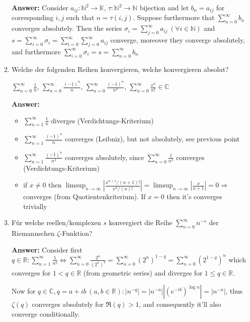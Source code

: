 \documentclass[11pt]{article}
\newcommand{\abs}[1]{\left|#1\right|}
\newcommand{\sumn}[4]{\sum_{#1=#2}^{#3}{#4}}
\newcommand{\RR}[0]{\mathbb{R}}
\newcommand{\CC}[0]{\mathbb{C}}
\newcommand{\NN}[0]{\mathbb{N}}
\newcommand{\KK}[0]{\mathbb{K}}
\begin{document}
\begin{enumerate}
    \textbf{Answer:} Consider $a_{ij}:\NN^2 \to \KK$, $\tau:\NN^2 \to \NN$ bijection and let $b_n = a_{ij}$ for corresponding $i, j$ such that $n = \tau(i, j)$. Suppose furthermore that $\sumn{n}{0}{\infty}{b_n}$ converges absolutely. Then the series $\sigma_i = \sumn{j}{0}{\infty}{a_{ij}}~(\forall i\in\NN)$ and $s = \sumn{i}{0}{\infty}{\sigma_i} = \sumn{i}{0}{\infty}{\sumn{j}{0}{\infty}{a_{ij}}}$ converge, moreover they converge absolutely, and furthermore $\sumn{i}{0}{\infty}{\sigma_i} = s = \sumn{n}{0}{\infty}{b_n}$

    \item  Welche der folgenden Reihen konvergieren, welche konvergieren absolut?
    \begin{center}
        $\sum_{n=0}^\infty {\frac{1}{n}}$, $\sum_{n=0}^\infty \frac{(-1)^n}{n}$, $\sum_{n=0}^\infty \frac{(-1)^n}{n^2}$, $\sum_{n=0}^\infty \frac{x^n}{n!} \in \mathbb{C}$
    \end{center}

    \textbf{Answer:}
    \begin{itemize}
        \item $\sum_{n=1}^\infty {\frac{1}{n}}$ diverges (Verdichtungs-Kriterium)
        \item $\sum_{n=1}^\infty \frac{(-1)^n}{n}$ converges (Leibniz), but not absolutely, see previous point
        \item $\sum_{n=1}^\infty \frac{(-1)^n}{n^2}$ converges absolutely, since $\sum_{n=0}^\infty \frac{1}{n^2}$ converges (Verdichtungs-Kriterium)
        \item if $x\neq0$ then $\limsup_{n\to\infty}\abs{\frac{x^{n+1}/(n+1)!}{x^{n}/(n)!}} = \limsup_{n\to\infty}\abs{\frac{x}{n+1}} = 0 \Rightarrow$ converges (from Quotientenkriterium). If $x=0$ then it's converges trivially
    \end{itemize}
    \item  Für welche reellen/komplexen $s$ konvergiert die Reihe $\sum_{n=0}^\infty n^{-s}$ der Riemannschen
    $\zeta$-Funktion?

    \textbf{Answer:} Consider first $q\in \mathbb{R}: \sumn{n}{1}{\infty}{\frac{1}{n^q}} \Leftrightarrow \sumn{n}{0}{\infty}{\frac{2^n}{(2^n)^q}} = \sumn{n}{0}{\infty}{(2^n)^{1-q}} = \sumn{n}{0}{\infty}{(2^{1-q})^n}$ which converges for $1 < q \in \mathbb{R}$ (from geometric series) and diverges for $1 \le q \in \mathbb{R}$.

    Now for $q\in\CC, q = a + ib~(a, b\in\RR)\colon \abs{n^{-q}} =\abs{n^{-a}} \abs{(e^{-ib})^{\log{n}}} = \abs{n^{-a}}$, thus $\zeta(q)$ converges absolutely for $\Re(q) > 1$, and consequently it'll also converge conditionally.


\end{enumerate}
\end{document}
